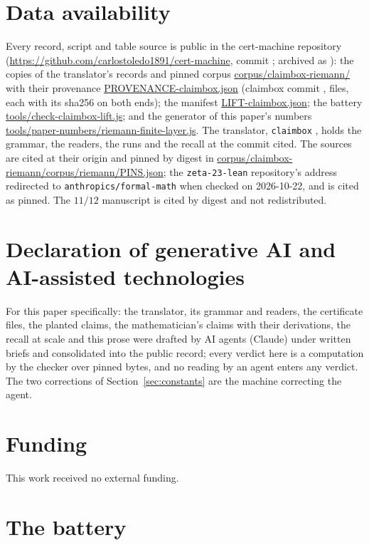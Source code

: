 \documentclass[preprint,11pt,authoryear,a4paper]{elsarticle}
\begin{document}
\section*{Data availability}
Every record, script and table source is public in the cert-machine repository (\url{https://github.com/carlostoledo1891/cert-machine}, commit \RfCommit; archived as \citealp{CMArchive}): the copies of the translator's records and pinned corpus \url{corpus/claimbox-riemann/} with their provenance \url{PROVENANCE-claimbox.json} (claimbox commit \texttt{\RfClaimboxCommitFull}, \RfLiftFiles{} files, each with its sha256 on both ends); the manifest \url{LIFT-claimbox.json}; the battery \url{tools/check-claimbox-lift.js}; and the generator of this paper's numbers \url{tools/paper-numbers/riemann-finite-layer.js}. The translator, \texttt{claimbox} \citep{Claimbox}, holds the grammar, the readers, the runs and the recall at the commit cited. The sources are cited at their origin and pinned by digest in \url{corpus/claimbox-riemann/corpus/riemann/PINS.json}; the \texttt{zeta-23-lean} repository's address redirected to \texttt{anthropics/formal-math} when checked on 2026-10-22, and is cited as pinned. The $11/12$ manuscript is cited by digest and not redistributed.

\section*{Declaration of generative AI and AI-assisted technologies}
\cmaideclaration{} For this paper specifically: the translator, its grammar and readers, the certificate files, the planted claims, the mathematician's claims with their derivations, the recall at scale and this prose were drafted by AI agents (Claude) under written briefs and consolidated into the public record; every verdict here is a computation by the checker over pinned bytes, and no reading by an agent enters any verdict. The two corrections of Section~\ref{sec:constants} are the machine correcting the agent.

\section*{Funding}
This work received no external funding.

\appendix
\section{The battery}\label{app:battery}
\end{document}

